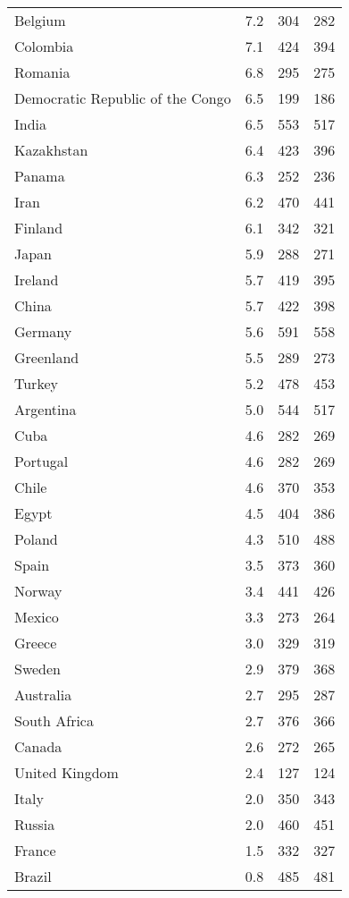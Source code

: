 \begin{table}[htbp]
\begin{tabular}{lrrr}
Belgium & 7.2 & 304 & 282 \\
Colombia & 7.1 & 424 & 394 \\
Romania & 6.8 & 295 & 275 \\
Democratic Republic of the Congo & 6.5 & 199 & 186 \\
India & 6.5 & 553 & 517 \\
Kazakhstan & 6.4 & 423 & 396 \\
Panama & 6.3 & 252 & 236 \\
Iran & 6.2 & 470 & 441 \\
Finland & 6.1 & 342 & 321 \\
Japan & 5.9 & 288 & 271 \\
Ireland & 5.7 & 419 & 395 \\
China & 5.7 & 422 & 398 \\
Germany & 5.6 & 591 & 558 \\
Greenland & 5.5 & 289 & 273 \\
Turkey & 5.2 & 478 & 453 \\
Argentina & 5.0 & 544 & 517 \\
Cuba & 4.6 & 282 & 269 \\
Portugal & 4.6 & 282 & 269 \\
Chile & 4.6 & 370 & 353 \\
Egypt & 4.5 & 404 & 386 \\
Poland & 4.3 & 510 & 488 \\
Spain & 3.5 & 373 & 360 \\
Norway & 3.4 & 441 & 426 \\
Mexico & 3.3 & 273 & 264 \\
Greece & 3.0 & 329 & 319 \\
Sweden & 2.9 & 379 & 368 \\
Australia & 2.7 & 295 & 287 \\
South Africa & 2.7 & 376 & 366 \\
Canada & 2.6 & 272 & 265 \\
United Kingdom & 2.4 & 127 & 124 \\
Italy & 2.0 & 350 & 343 \\
Russia & 2.0 & 460 & 451 \\
France & 1.5 & 332 & 327 \\
Brazil & 0.8 & 485 & 481 \\
\bottomrule
\end{tabular}
\end{table}
